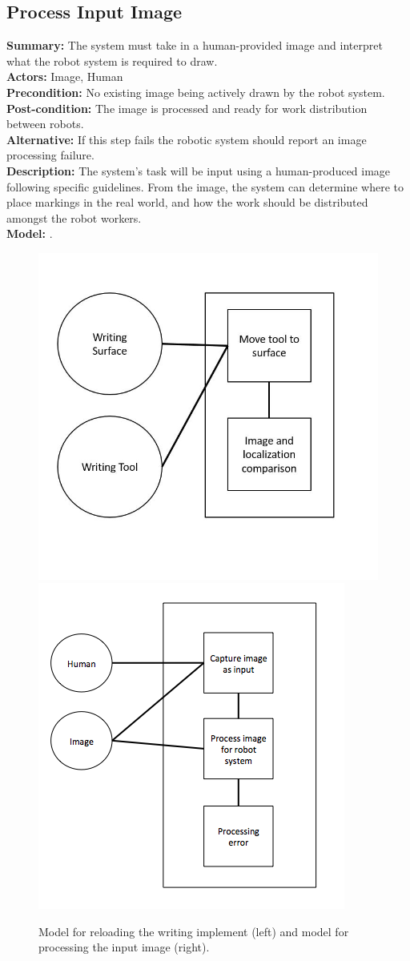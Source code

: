\subsection{Process Input Image}
\textbf{Summary:} The system must take in a human-provided image and interpret what the robot system is required to draw. \\
\textbf{Actors:} Image, Human \\
\textbf{Precondition:}  No existing image being actively drawn by the robot system. \\
\textbf{Post-condition:} The image is processed and ready for work distribution between robots. \\
\textbf{Alternative:} If this step fails the robotic system should report an image processing failure. \\
\textbf{Description:} The system's task will be input using a human-produced image following specific guidelines. From the image, the system can determine where to place markings in the real world, and how the work should be distributed amongst the robot workers. \\
\textbf{Model:} .\\

\begin{figure}
 \centering
  \includegraphics[width=0.48\columnwidth]{figs/use_case-use_writing_implement.jpg}
  \includegraphics[width=0.48\columnwidth]{figs/use_case-process_input_image.jpg}
 \caption{Model for reloading the writing implement (left) and model for processing the input image (right).}
 \label{fig:reload_process}
\end{figure}


